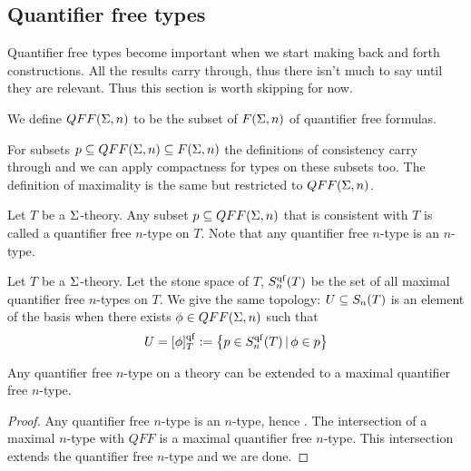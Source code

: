 \subsection{Quantifier free types}
Quantifier free types become important when we start making 
back and forth constructions.
All the results carry through, 
thus there isn't much to say until they are relevant.
Thus this section is worth skipping for now.
\begin{dfn}
    We define $QFF(\Sigma,n)$ to be the subset of $F(\Sigma,n)$ 
    of quantifier free formulas.

    For subsets $p \subseteq QFF(\Sigma,n) \subseteq F(\Sigma,n)$ 
    the definitions of consistency carry through and 
    we can apply compactness for types on these subsets too.
    The definition of maximality is the same but restricted to $QFF(\Sigma,n)$.

    Let $T$ be a $\Sigma$-theory.
    Any subset $p \subseteq QFF(\Sigma,n)$ that is consistent with $T$
    is called a quantifier free $n$-type on $T$.
    Note that any quantifier free $n$-type is an $n$-type.
\end{dfn}

\begin{dfn}
    Let $T$ be a $\Sigma$-theory.
    Let the stone space of $T$, 
    $S_n^{\operatorname{qf}}(T)$ be the set of all maximal quantifier free $n$-types on $T$.
    We give the same topology:
    $U \subseteq S_n(T)$ is an element of the basis when there exists 
    $\phi \in QFF(\Sigma,n)$ such that 
    \[U = [\phi]_T^{\operatorname{qf}} := \left\{p \in S_n^{\operatorname{qf}}(T) \,|\, \phi \in p\right\}\]
\end{dfn}

\begin{prop}
    Any quantifier free $n$-type on a theory 
    can be extended to a maximal quantifier free 
    $n$-type.
\end{prop}
\begin{proof}
    Any quantifier free $n$-type is an $n$-type, 
    hence .
    The intersection of a maximal $n$-type with $QFF$ is a maximal 
    quantifier free $n$-type. 
    This intersection extends the quantifier free $n$-type and we are done.
\end{proof}

